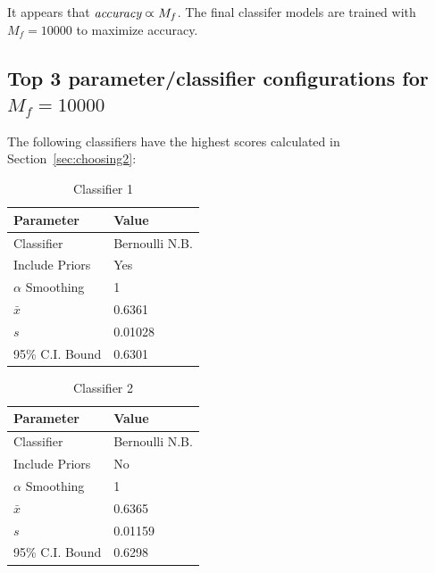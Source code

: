\documentclass[11pt]{article}
\begin{document}
It appears that $\emph{accuracy} \varpropto M_f$.
The final classifer models are trained with $M_f = 10000$ to maximize accuracy.

\subsection{Top 3 parameter/classifier configurations for $M_f = 10000$}\label{sec:top3}

The following classifiers have the highest scores calculated in Section~\ref{sec:choosing2}:

\begin{table}[H]
	\begin{center}
		\begin{tabular}{|l|l|}			
			\hline
			Parameter & Value \\
			\hline
			Classifier & Bernoulli N.B. \\
			Include Priors & Yes \\
			$\alpha$ Smoothing & 1 \\
			\hline\hline
			$\bar{x}$ &  0.6361\\
			$s$ & 0.01028 \\
			95\% C.I. Bound & 0.6301 \\
			\hline
		\end{tabular}
		\caption{Classifier 1}
		\label{tbl:1st10000}
	\end{center}
\end{table}

\begin{table}[H]
	\begin{center}
		\begin{tabular}{|l|l|}			
			\hline
			Parameter & Value \\
			\hline
			Classifier & Bernoulli N.B. \\
			Include Priors & No \\
			$\alpha$ Smoothing & 1 \\
			\hline\hline
			$\bar{x}$ &  0.6365\\
			$s$ &   0.01159 \\
			95\% C.I. Bound & 0.6298 \\
			\hline
		\end{tabular}
		\caption{Classifier 2}
		\label{tbl:2nd10000}
	\end{center}
\end{table}
\end{document}

